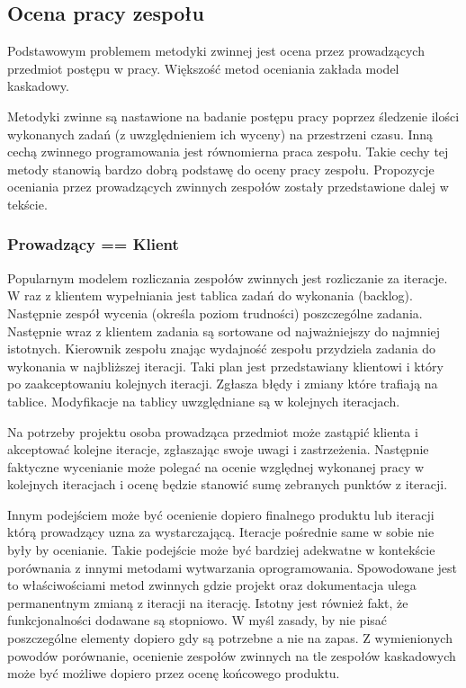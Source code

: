 \subsection{Ocena pracy zespołu}

Podstawowym problemem metodyki zwinnej jest ocena przez prowadzących przedmiot postępu w pracy. Większość metod oceniania zakłada model kaskadowy. 

Metodyki zwinne są nastawione na badanie postępu pracy poprzez śledzenie ilości wykonanych zadań (z uwzględnieniem ich wyceny) na przestrzeni czasu. Inną cechą zwinnego programowania jest równomierna praca zespołu. Takie cechy tej metody stanowią bardzo dobrą podstawę do oceny pracy zespołu. Propozycje oceniania przez prowadzących zwinnych zespołów zostały przedstawione dalej w tekście.

\subsubsection{Prowadzący == Klient}

Popularnym modelem rozliczania zespołów zwinnych jest rozliczanie za iteracje. W raz z klientem wypełniania jest tablica zadań do wykonania (backlog). Następnie zespół wycenia (określa poziom trudności) poszczególne zadania. Następnie wraz z klientem zadania są sortowane od najważniejszy do najmniej istotnych. Kierownik zespołu znając wydajność zespołu przydziela zadania do wykonania w najbliższej iteracji. Taki plan jest przedstawiany klientowi i który po zaakceptowaniu kolejnych iteracji. Zgłasza błędy i zmiany które trafiają na tablice. Modyfikacje na tablicy uwzględniane są w kolejnych iteracjach.

Na potrzeby projektu osoba prowadząca przedmiot może zastąpić klienta i akceptować kolejne iteracje, zgłaszając swoje uwagi i zastrzeżenia. Następnie faktyczne wycenianie może polegać na ocenie względnej wykonanej pracy w kolejnych iteracjach i ocenę będzie stanowić sumę zebranych punktów z iteracji. 

Innym podejściem może być ocenienie dopiero finalnego produktu lub iteracji którą prowadzący uzna za wystarczającą. Iteracje pośrednie same w sobie nie były by ocenianie. Takie podejście może być bardziej adekwatne w kontekście porównania z innymi metodami wytwarzania oprogramowania. Spowodowane jest to właściwościami metod zwinnych gdzie projekt oraz dokumentacja ulega permanentnym zmianą z iteracji na iterację. Istotny jest również fakt, że funkcjonalności dodawane są stopniowo. W myśl zasady, by nie pisać poszczególne elementy dopiero gdy są potrzebne a nie na zapas. Z wymienionych powodów porównanie, ocenienie zespołów zwinnych na tle zespołów kaskadowych może być możliwe dopiero przez ocenę końcowego produktu. 






